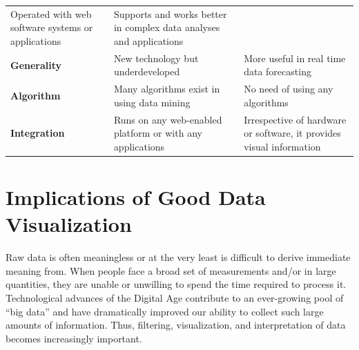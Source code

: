 \documentclass[]{book}
\begin{document}
\begin{longtable}[]{@{}lll@{}}
\begin{minipage}[t]{0.42\columnwidth}
Operated with web software systems or applications\strut
\end{minipage} & \begin{minipage}[t]{0.42\columnwidth}\raggedright
Supports and works better in complex data analyses and applications\strut
\end{minipage}\tabularnewline
\begin{minipage}[t]{0.08\columnwidth}\raggedright
\textbf{Generality}\strut
\end{minipage} & \begin{minipage}[t]{0.42\columnwidth}\raggedright
New technology but underdeveloped\strut
\end{minipage} & \begin{minipage}[t]{0.42\columnwidth}\raggedright
More useful in real time data forecasting\strut
\end{minipage}\tabularnewline
\begin{minipage}[t]{0.08\columnwidth}\raggedright
\textbf{Algorithm}\strut
\end{minipage} & \begin{minipage}[t]{0.42\columnwidth}\raggedright
Many algorithms exist in using data mining\strut
\end{minipage} & \begin{minipage}[t]{0.42\columnwidth}\raggedright
No need of using any algorithms\strut
\end{minipage}\tabularnewline
\begin{minipage}[t]{0.08\columnwidth}\raggedright
\textbf{Integration}\strut
\end{minipage} & \begin{minipage}[t]{0.42\columnwidth}\raggedright
Runs on any web-enabled platform or with any applications\strut
\end{minipage} & \begin{minipage}[t]{0.42\columnwidth}\raggedright
Irrespective of hardware or software, it provides visual information\strut
\end{minipage}\tabularnewline
\bottomrule
\end{longtable}

\hypertarget{implications-of-good-data-visualization}{%
\section{Implications of Good Data Visualization}\label{implications-of-good-data-visualization}}

Raw data is often meaningless or at the very least is difficult to derive immediate meaning from. When people face a broad set of measurements and/or in large quantities, they are unable or unwilling to spend the time required to process it. Technological advances of the Digital Age contribute to an ever-growing pool of ``big data'' and have dramatically improved our ability to collect such large amounts of information. Thus, filtering, visualization, and interpretation of data becomes increasingly important.
\end{document}
